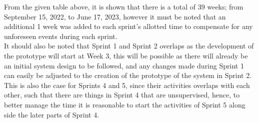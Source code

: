 \vspace{0.5cm}
From the given table above, it is 
shown that there is a total of 39 weeks; from September 15, 2022, 
to June 17, 2023, however it must be noted that an additional 1 week 
was added to each sprint’s allotted time to compensate for any unforeseen 
events during each sprint.
\vspace{0.5cm}
\\ It should also be noted that Sprint 1 and Sprint 2 overlaps as 
the development of the prototype will start at Week 3, this will 
be possible as there will already be an initial system design to be followed, 
and any changes made during Sprint 1 can easily be adjusted to the creation of 
the prototype of the system in Sprint 2. This is also the case for Sprints 4 and 5, 
since their activities overlaps with each other, such that there are things in 
Sprint 4 that are unsupervised, hence, to better manage the time it is reasonable 
to start the activities of Sprint 5 along side the later parts of Sprint 4.